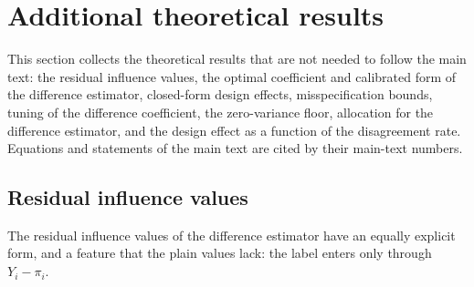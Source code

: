 \section{Additional theoretical results}\label{si:theory-extra}

This section collects the theoretical results that are not needed to follow the main text: the residual influence values, the
optimal coefficient and calibrated form of the difference estimator, closed-form design effects, misspecification bounds,
tuning of the difference coefficient, the zero-variance floor, allocation for the difference estimator, and the design effect as
a function of the disagreement rate. Equations and statements of the main text are cited by their main-text numbers.

\subsection{Residual influence values}\label{si:theory-resid}

The residual influence values of the difference estimator have an equally explicit form, and a
feature that the plain values lack: the label enters only through $Y_i-\pi_i$.

